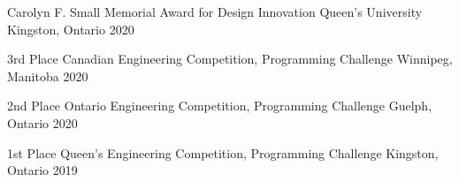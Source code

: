 



\begin{cvhonors}


  \cvhonor
    {Carolyn F. Small Memorial Award for Design Innovation} %
    {Queen's University} %
    {Kingston, Ontario} %
    {2020} %

  \cvhonor
    {3rd Place} %
    {Canadian Engineering Competition, Programming Challenge} %
    {Winnipeg, Manitoba} %
    {2020} %

  \cvhonor
    {2nd Place} %
    {Ontario Engineering Competition, Programming Challenge} %
    {Guelph, Ontario} %
    {2020} %

  \cvhonor
    {1st Place} %
    {Queen's Engineering Competition, Programming Challenge} %
    {Kingston, Ontario} %
    {2019} %
    
\end{cvhonors}